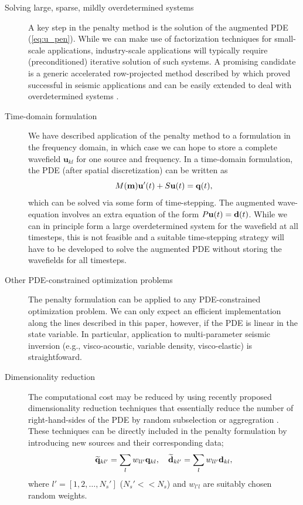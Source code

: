 \documentclass{iopart}
\begin{document}
\begin{description}

\item[Solving large, sparse, mildly overdetermined systems] 
A key step in the penalty method is the solution of the augmented PDE
(\ref{eq:u_pen}). While we can make use of factorization techniques for
small-scale applications, industry-scale applications will typically
require (preconditioned) iterative solution of such systems. A promising
candidate is a generic accelerated row-projected method described by
\cite{Bjorck1979,Gordon2013} which proved successful in seismic
applications and can be easily extended to deal with overdetermined
systems \cite{Censor1983}.

\item[Time-domain formulation]
We have described application of the penalty method to a formulation in
the frequency domain, in which case we can hope to store a complete
wavefield $\mathbf{u}_{kl}$ for one source and frequency. In a
time-domain formulation, the PDE (after spatial discretization) can be
written as
 \[
 M(\mathbf{m})\mathbf{u}'(t) + S\mathbf{u}(t) = \mathbf{q}(t),
 \]
which can be solved via some form of time-stepping. The augmented
wave-equation involves an extra equation of the form $P\mathbf{u}(t) =
\mathbf{d}(t)$. While we can in principle form a large overdetermined system
for the wavefield at all timesteps, this is not feasible and a suitable
time-stepping strategy will have to be developed to solve the augmented
PDE without storing the wavefields for all timesteps.

\item[Other PDE-constrained optimization problems]
The penalty formulation can be applied to any PDE-constrained
optimization problem. We can only expect an efficient implementation
along the lines described in this paper, however, if the PDE is linear
in the state variable. In particular, application to multi-parameter
seismic inversion (e.g., visco-acoustic, variable density,
visco-elastic) is straightfoward.

\item[Dimensionality reduction]
The computational cost may be reduced by using recently proposed
dimensionality reduction techniques that essentially reduce the number
of right-hand-sides of the PDE by random subselection or aggregration
\cite{Haber2012,Friedlander2012,VanLeeuwen2012b}. These techniques can
be directly included in the penalty formulation by introducing new
sources and their corresponding data;
\[
\widetilde{\mathbf{q}}_{kl'} = \sum_{l}w_{ll'}\mathbf{q}_{kl}, \quad \widetilde{\mathbf{d}}_{kl'} = \sum_{l}w_{ll'}\mathbf{d}_{kl},
\]
where $l' = [1,2,\ldots,N_s']$ ($N_s' << N_s$) and $w_{l'l}$ are
suitably chosen random weights.


\end{description}
\end{document}

